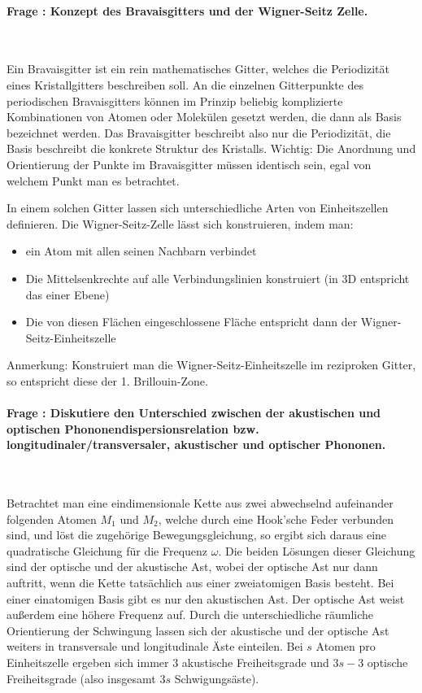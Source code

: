 \documentclass[a4paper, 11pt, ngerman, parskip=half-]{scrartcl}
\newcounter{question}
\newcommand{\question}[1]{\stepcounter{question}\paragraph{Frage \thequestion: #1}~}
\begin{document}
\question{Konzept des Bravaisgitters und der Wigner-Seitz Zelle.}
\label{q:54}

Ein Bravaisgitter ist ein rein mathematisches Gitter, welches die Periodizität eines Kristallgitters beschreiben soll. An die einzelnen Gitterpunkte des periodischen Bravaisgitters können im Prinzip beliebig komplizierte Kombinationen von Atomen oder Molekülen gesetzt werden, die dann als Basis bezeichnet werden. Das Bravaisgitter beschreibt also nur die Periodizität, die Basis beschreibt die konkrete Struktur des Kristalls. Wichtig: Die Anordnung und Orientierung der Punkte im Bravaisgitter müssen identisch sein, egal von welchem Punkt man es betrachtet.

In einem solchen Gitter lassen sich unterschiedliche Arten von Einheitszellen definieren. Die Wigner-Seitz-Zelle lässt sich konstruieren, indem man:
\begin{itemize}
    \item ein Atom mit allen seinen Nachbarn verbindet
    \item Die Mittelsenkrechte auf alle Verbindungslinien konstruiert (in 3D entspricht das einer Ebene)
    \item Die von diesen Flächen eingeschlossene Fläche entspricht dann der Wigner-Seitz-Einheitszelle
\end{itemize}
Anmerkung: Konstruiert man die Wigner-Seitz-Einheitszelle im reziproken Gitter, so entspricht diese der 1. Brillouin-Zone.

\question{Diskutiere den Unterschied zwischen der akustischen und optischen Phononendispersionsrelation bzw. longitudinaler/transversaler, akustischer und optischer Phononen.}
\label{q:55}

Betrachtet man eine eindimensionale Kette aus zwei abwechselnd aufeinander folgenden Atomen $M_1$ und $M_2$, welche durch eine Hook'sche Feder verbunden sind, und löst die zugehörige Bewegungsgleichung, so ergibt sich daraus eine quadratische Gleichung für die Frequenz $\omega$. Die beiden Lösungen dieser Gleichung sind der optische und der akustische Ast, wobei der optische Ast nur dann auftritt, wenn die Kette tatsächlich aus einer zweiatomigen Basis besteht. Bei einer einatomigen Basis gibt es nur den akustischen Ast. Der optische Ast weist außerdem eine höhere Frequenz auf. Durch die unterschiedliche räumliche Orientierung der Schwingung lassen sich der akustische und der optische Ast weiters in transversale und longitudinale Äste einteilen. Bei $s$ Atomen pro Einheitszelle ergeben sich immer $3$ akustische Freiheitsgrade und $3s-3$ optische Freiheitsgrade (also insgesamt $3s$ Schwigungsäste).
\end{document}
